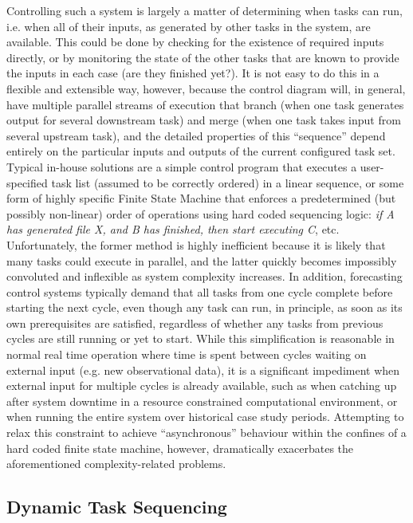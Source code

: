 \documentclass[11pt,a4paper]{article}
\begin{document}
Controlling such a system is largely a matter of determining when tasks
can run, i.e. when all of their inputs, as generated by other tasks in
the system, are available.  This could be done by checking for the
existence of required inputs directly, or by monitoring the state of the
other tasks that are known to provide the inputs in each case (are they
finished yet?). It is not easy to do this in a flexible and extensible
way, however, because the control diagram will, in general, have
multiple parallel streams of execution that branch (when one task
generates output for several downstream task) and merge (when one task
takes input from several upstream task), and the detailed properties of
this ``sequence'' depend entirely on the particular inputs and outputs
of the current configured task set. Typical in-house solutions are a
simple control program that executes a user-specified task list (assumed
to be correctly ordered) in a linear sequence,  or some form of highly
specific Finite State Machine that enforces a predetermined (but
possibly non-linear) order of operations using hard coded sequencing
logic: {\em if A has generated file X, and B has finished, then start
executing C}, etc. Unfortunately, the former method is highly
inefficient because it is likely that many tasks could execute in
parallel, and the latter quickly becomes impossibly convoluted and
inflexible as system complexity increases. In addition, forecasting
control systems typically demand that all tasks from one cycle complete
before starting the next cycle, even though any task can run, in
principle, as soon as its own prerequisites are satisfied, regardless of
whether any tasks from previous cycles are still running or yet to
start.  While this simplification is reasonable in normal real time
operation where time is spent between cycles waiting on external input
(e.g. new observational data), it is a significant impediment when
external input for multiple cycles is already available, such as when
catching up after system downtime in a resource constrained
computational environment, or when running the entire system over
historical case study periods.  Attempting to relax this constraint to
achieve ``asynchronous'' behaviour within the confines of a hard coded
finite state machine, however, dramatically exacerbates the
aforementioned complexity-related problems.  


\subsection{Dynamic Task Sequencing}
\end{document}
